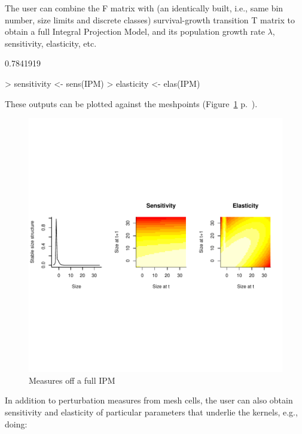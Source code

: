 \documentclass{article}
\begin{document}
The user can combine the F matrix with (an identically built, i.e., same bin number, size limits and discrete classes) survival-growth transition T matrix to
obtain a full Integral Projection Model, and its population growth rate $\lambda$, sensitivity, elasticity, etc. 
\begin{Schunk}
\begin{Soutput}
[1] 0.7841919
\end{Soutput}
\begin{Sinput}
> sensitivity <- sens(IPM)
> elasticity <- elas(IPM)
\end{Sinput}
\end{Schunk}
These outputs can be plotted against the meshpoints (Figure~\ref{fig:four} p.~\pageref{fig:four}).
\begin{figure}
\begin{center}
\includegraphics{IPMpack_Vignette-fig4}
\end{center}
\caption{Measures off a full IPM}
\label{fig:four}
\end{figure}
In addition to perturbation measures from mesh cells, the user can also obtain sensitivity and elasticity of particular parameters that underlie the kernels, e.g., doing:
\end{document}
